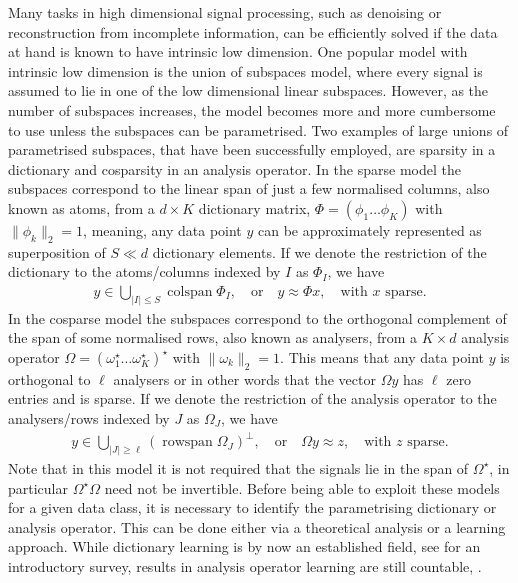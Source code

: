 \documentclass[11pt, onecolumn, journal,compsoc]{IEEEtran}
\newcommand\dico{\Phi}
\newcommand\atom{\phi}
\newcommand{\colspan}{\operatorname{colspan}}
\newcommand{\rowspan}{\operatorname{rowspan}}
\theoremstyle{plain}
\theoremstyle{remark}
\begin{document}
Many tasks in high dimensional signal processing, such as denoising or reconstruction from incomplete information, can be efficiently solved if the data at hand is known to have intrinsic low dimension. One popular model with intrinsic low dimension is the union of subspaces model, where every signal is assumed to lie in one of the low dimensional linear subspaces. However, as the number of subspaces increases, the model becomes more and more cumbersome to use unless the subspaces can be parametrised. Two examples of large unions of parametrised subspaces, that have been successfully employed, are sparsity in a dictionary and cosparsity in an analysis operator. In the sparse model the subspaces correspond to the linear span of just a few normalised columns, also known as atoms, from a $d\times K$ dictionary matrix, $\dico=(\atom_1\ldots \atom_K)$ with $\|\atom_k\|_2=1$, meaning, any data point $y$ can be approximately represented as superposition of $S\ll d$ dictionary elements. If we denote the restriction of the dictionary to the atoms/columns indexed by $I$ as $\dico_I$, we have
\begin{align*}
y \in \bigcup_{|I|\leq S} \colspan \dico_I,  \quad \mbox{or} \quad y \approx \dico x, \quad \mbox{with } x  \mbox{ sparse}.
\end{align*}
In the cosparse model the subspaces correspond to the orthogonal complement of the span of some normalised rows, also known as analysers, from a $K\times d$ analysis operator $\Omega=(\omega_1^\star \ldots \omega_K^\star)^\star$ with $\|\omega_k\|_2=1$. This means that any data point $y$ is orthogonal to $\ell$ analysers or in other words that the vector $\Omega y$ has $\ell$ zero entries and is sparse. If we denote the restriction of the analysis operator to the analysers/rows indexed by $J$ as $\Omega_J$, we have
\begin{align*}
y \in \bigcup_{|J|\geq \ell} (\rowspan \Omega_J)^\perp,  \quad \mbox{or} \quad \Omega y \approx z, \quad \mbox{with } z  \mbox{ sparse}.
\end{align*}
Note that in this model it is not required that the signals lie in the span of $\Omega^\star$, in particular $\Omega^\star \Omega$ need not be invertible. Before being able to exploit these models for a given data class, it is necessary to identify the parametrising dictionary or analysis operator. This can be done either via a theoretical analysis or a learning approach. While dictionary learning is by now an established field, see \cite{rubrel10} for an introductory survey, results in analysis operator learning are still countable, \cite{yanagrda11, rabr13,nadaelgr13, yanagrda13,hakldi13,rupeel13,dowada14,ekba14,ginaelgr14,sewogrkl16,dowadaplha16}. \\
\end{document}
